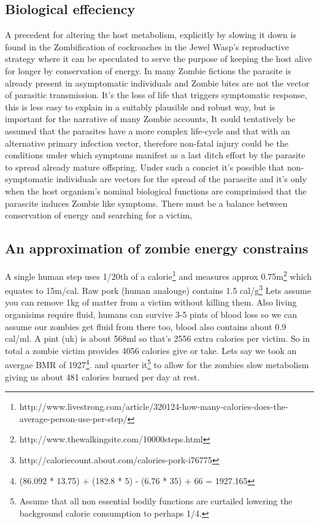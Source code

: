 \subsection{Biological effeciency}
A precedent for altering the host metabolism, explicitly by slowing it down is found in the Zombification of cockroaches in the Jewel Wasp's reproductive strategy where it can be speculated to serve the purpose of keeping the host alive for longer by conservation of energy.
In many Zombie fictions the parasite is already present in asymptomatic individuals and Zombie bites are not the vector of parasitic transmission. It's the loss of life that triggers symptomatic response, this is less easy to explain in a suitably plausible and robust way, but is important for the narrative of many Zombie accounts, It could tentatively be assumed that the parasites have a more complex life-cycle and that with an alternative primary infection vector, therefore non-fatal injury could be the conditions under which symptoms manifest as a last ditch effort by the parasite to spread already mature offspring.
Under such a conciet it's possible that non-symptomatic individuals are vectors for the spread of the parascite and it's only when the host organism's nominal biological functions are comprimised that the parascite induces Zombie like symptoms.
There must be a balance between conservation of energy and searching for a victim,
\subsection{An approximation of zombie energy constrains}
A single human step uses 1/20th of a calorie\footnote{http://www.livestrong.com/article/320124-how-many-calories-does-the-average-person-use-per-step/} and measures approx 0.75m\footnote{http://www.thewalkingsite.com/10000steps.html} 
which equates to 15m/cal. Raw pork (human analouge) contains 1.5 cal/g\footnote{http://caloriecount.about.com/calories-pork-i76775}
Lets assume you can remove 1kg of matter from a victim without killing them.
Also living organisims require fluid, humans can survive 3-5 pints of blood loss so we can assume our zombies get fluid from there too, blood also contains about 0.9 cal/ml.
A pint (uk) is about 568ml so that's 2556 extra calories per victim.
So in total a zombie victim provides 4056 calories give or take.
Lets say we took an avergae BMR of 1927\footnote{(86.092 * 13.75) + (182.8 * 5) - (6.76 * 35) + 66 = 1927.165}. and quarter it\footnote{Assume that all non essential bodily functions are curtailed lowering the background calorie consumption to perhaps 1/4.} to allow for the zombies slow metabolism giving us  
about 481 calories burned per day at rest.

\endinput
